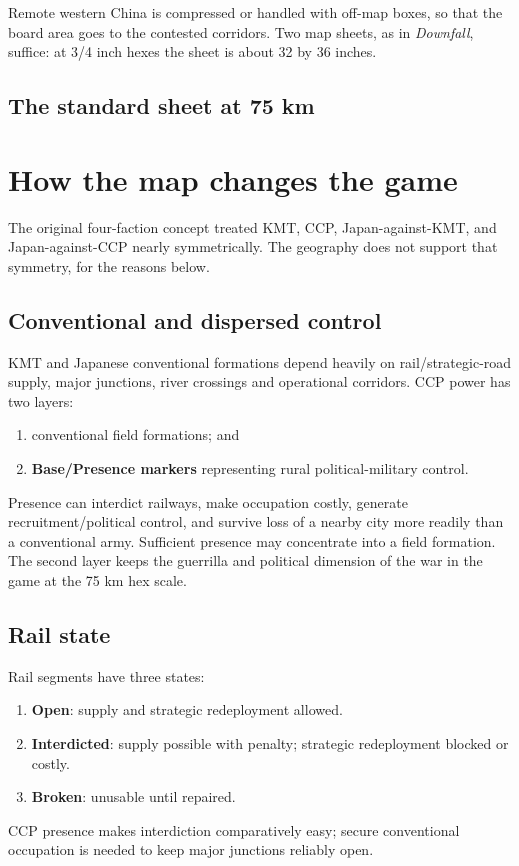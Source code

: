 \documentclass[11pt]{article}
\begin{document}
Remote western China is compressed or handled with off-map boxes, so that the board area goes to the contested corridors. Two map sheets, as in \emph{Downfall}, suffice: at 3/4 inch hexes the sheet is about 32 by 36 inches.

\subsection{The standard sheet at 75 km}\label{sub:sheet75}


\section{How the map changes the game}
The original four-faction concept treated KMT, CCP, Japan-against-KMT, and Japan-against-CCP nearly symmetrically. The geography does not support that symmetry, for the reasons below.

\subsection{Conventional and dispersed control}
KMT and Japanese conventional formations depend heavily on rail/strategic-road supply, major junctions, river crossings and operational corridors. CCP power has two layers:
\begin{enumerate}
\item conventional field formations; and
\item \textbf{Base/Presence markers} representing rural political-military control.
\end{enumerate}
Presence can interdict railways, make occupation costly, generate recruitment/political control, and survive loss of a nearby city more readily than a conventional army. Sufficient presence may concentrate into a field formation. The second layer keeps the guerrilla and political dimension of the war in the game at the 75 km hex scale.

\subsection{Rail state}
Rail segments have three states:
\begin{enumerate}
\item \textbf{Open}: supply and strategic redeployment allowed.
\item \textbf{Interdicted}: supply possible with penalty; strategic redeployment blocked or costly.
\item \textbf{Broken}: unusable until repaired.
\end{enumerate}
CCP presence makes interdiction comparatively easy; secure conventional occupation is needed to keep major junctions reliably open.
\end{document}
